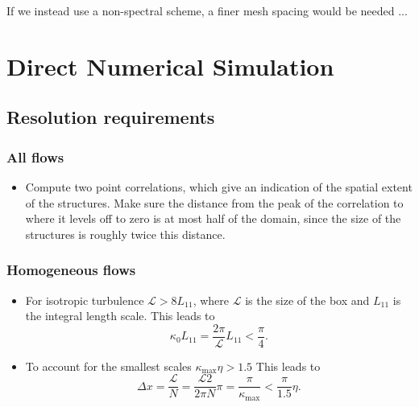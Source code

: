 \documentclass[oneside,a4paper,11pt]{report}
\begin{document}
If we instead use a non-spectral scheme, a finer mesh spacing would be needed ...


%
\chapter{Direct Numerical Simulation}
%

\section{Resolution requirements}

\subsection{All flows}
\begin{itemize}
\item Compute two point correlations, which give an indication of the spatial extent of the structures. Make sure the distance from the peak of the correlation to where it levels off to zero is at most half of the domain, since the size of the structures is roughly twice this distance.

\end{itemize}

\subsection{Homogeneous flows}
\begin{itemize}
\item For isotropic turbulence $\mathcal{L} > 8 L_{11}$, where $\mathcal{L}$ is the size of the box and $L_{11}$ is the integral length scale. This leads to
\begin{equation}
\kappa_0 L_{11} = \frac{2 \pi}{\mathcal{L}} L_{11} < \frac{\pi}{4} .
\end{equation}

\item To account for the smallest scales $\kappa_{\text{max}} \eta > 1.5$ This leads to
\begin{equation}
\Delta x = \frac{\mathcal{L}}{N} = \frac{ \mathcal{L}2 }{2\pi N} \pi = \frac{\pi}{\kappa_{\text{max}}} < \frac{\pi}{1.5} \eta .
\end{equation}
\end{itemize}
\end{document}
